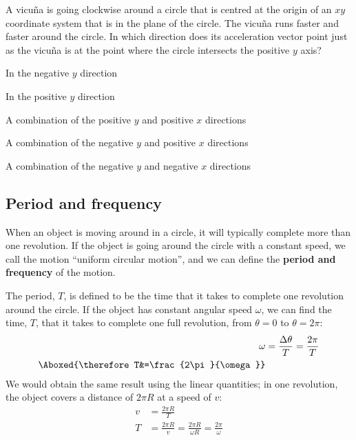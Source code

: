 \begin{checkpointMC}{A vicu\~na is going clockwise around a circle that is centred at the origin of an $xy$ coordinate system that is in the plane of the circle. The vicu\~na runs faster and faster around the circle. In which direction does its acceleration vector point just as the vicu\~na is at the point where the circle intersects the positive $y$ axis?}
\item In the negative $y$ direction
\item In the positive $y$ direction
\item A combination of the positive $y$ and positive $x$ directions
\item A combination of the negative $y$ and positive $x$ directions %
\item A combination of the negative $y$ and negative $x$ directions
\end{checkpointMC}

\subsection{Period and frequency}
When an object is moving around in a circle, it will typically complete more than one revolution. If the object is going around the circle with a constant speed, we call the motion ``uniform circular motion'', and we can define the \textbf{period and frequency} of the motion. 

The period, $T$, is defined to be the time that it takes to complete one revolution around the circle. If the object has constant angular speed $\omega$, we can find the time, $T$, that it takes to complete one full revolution, from $\theta=0$ to $\theta=2\pi$:
\begin{align}
\omega&=\frac{\Delta \theta}{T}=\frac{2\pi}{T}\nonumber\\
\Aboxed{\therefore T&=\frac{2\pi}{\omega}}
\end{align}
We would obtain the same result using the linear quantities; in one revolution, the object covers a distance of $2\pi R$ at a speed of $v$:
\begin{align*}
v&=\frac{2\pi R}{T}\\
T&=\frac{2\pi R}{v}=\frac{2\pi R}{\omega R}=\frac{2\pi}{\omega}
\end{align*}

